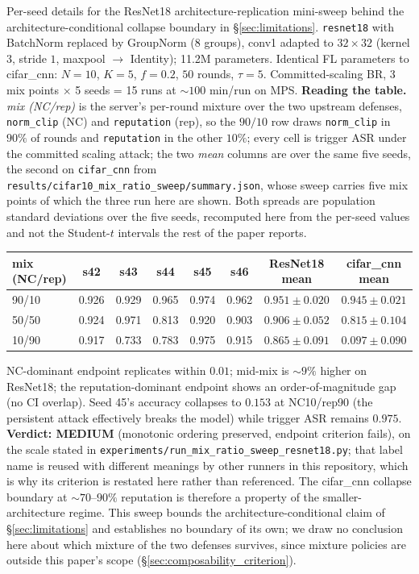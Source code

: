 \documentclass{article}
\begin{document}
Per-seed details for the ResNet18 architecture-replication mini-sweep behind the architecture-conditional collapse boundary in §\ref{sec:limitations}. \texttt{resnet18} with BatchNorm replaced by GroupNorm (8 groups), conv1 adapted to $32\times 32$ (kernel $3$, stride $1$, maxpool $\to$ Identity); 11.2M parameters. Identical FL parameters to cifar\_cnn: $N{=}10$, $K{=}5$, $f{=}0.2$, $50$ rounds, $\tau=5$. Committed-scaling BR, 3 mix points $\times$ 5 seeds = 15 runs at $\sim 100$ min/run on MPS. \textbf{Reading the table.} \emph{mix (NC/rep)} is the server's per-round mixture over the two upstream defenses, \texttt{norm\_clip} (NC) and \texttt{reputation} (rep), so the $90/10$ row draws \texttt{norm\_clip} in $90\%$ of rounds and \texttt{reputation} in the other $10\%$; every cell is trigger ASR under the committed scaling attack; the two \emph{mean} columns are over the same five seeds, the second on \texttt{cifar\_cnn} from \texttt{results/}\allowbreak\texttt{cifar10\_mix\_ratio\_sweep/}\allowbreak\texttt{summary.json}, whose sweep carries five mix points of which the three run here are shown. Both spreads are population standard deviations over the five seeds, recomputed here from the per-seed values and not the Student-$t$ intervals the rest of the paper reports.

\begin{center}\small
\begin{tabular}{l|ccccc|c|c}
\toprule
mix (NC/rep) & s42 & s43 & s44 & s45 & s46 & ResNet18 mean & cifar\_cnn mean \\
\midrule
90/10 & 0.926 & 0.929 & 0.965 & 0.974 & 0.962 & $\mathbf{0.951 \pm 0.020}$ & $0.945 \pm 0.021$ \\
50/50 & 0.924 & 0.971 & 0.813 & 0.920 & 0.903 & $\mathbf{0.906 \pm 0.052}$ & $0.815 \pm 0.104$ \\
10/90 & 0.917 & 0.733 & 0.783 & 0.975 & 0.915 & $\mathbf{0.865 \pm 0.091}$ & $\mathbf{0.097 \pm 0.090}$ \\
\bottomrule
\end{tabular}
\end{center}

NC-dominant endpoint replicates within $0.01$; mid-mix is $\sim 9\%$ higher on ResNet18; the reputation-dominant endpoint shows an order-of-magnitude gap (no CI overlap). Seed 45's accuracy collapses to $0.153$ at NC10/rep90 (the persistent attack effectively breaks the model) while trigger ASR remains $0.975$. \textbf{Verdict: MEDIUM} (monotonic ordering preserved, endpoint criterion fails), on the scale stated in \texttt{experiments/\allowbreak run\_mix\_ratio\_sweep\_resnet18.py}; that label name is reused with different meanings by other runners in this repository, which is why its criterion is restated here rather than referenced. The cifar\_cnn collapse boundary at $\sim 70$--$90\%$ reputation is therefore a property of the smaller-architecture regime. This sweep bounds the architecture-conditional claim of §\ref{sec:limitations} and establishes no boundary of its own; we draw no conclusion here about which mixture of the two defenses survives, since mixture policies are outside this paper's scope (§\ref{sec:composability_criterion}).
\end{document}
